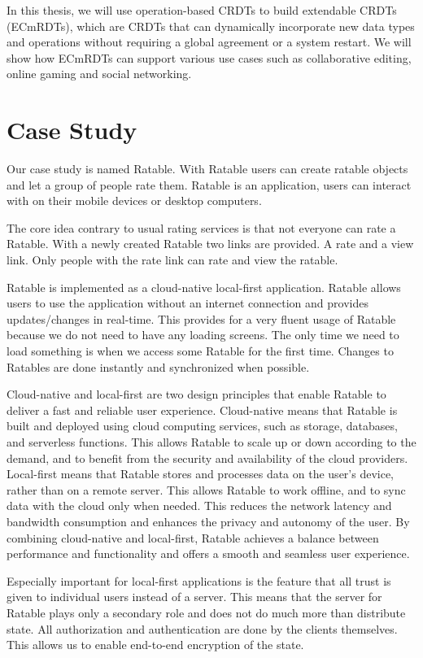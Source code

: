 \documentclass[
	ngerman,
	ruledheaders=section,   %
	class=report,		    %
	thesis={type=bachelor}, %
	accentcolor=9c,			%
	custommargins=true,    %
	marginpar=false,        %
	parskip=half-,          %
	fontsize=11pt,          %
]{tudapub}
\begin{document}
In this thesis, we will use operation-based CRDTs to build extendable CRDTs (ECmRDTs), which are CRDTs that can dynamically incorporate new data types and operations without requiring a global agreement or a system restart. We will show how ECmRDTs can support various use cases such as collaborative editing, online gaming and social networking.

\section{Case Study}
Our case study is named Ratable. With Ratable users can create ratable objects and let a group of people rate them. Ratable is an application, users can interact with on their mobile devices or desktop computers. 

The core idea contrary to usual rating services is that not everyone can rate a Ratable. With a newly created Ratable two links are provided. A rate and a view link. Only people with the rate link can rate and view the ratable.

Ratable is implemented as a cloud-native local-first application. Ratable allows users to use the application without an internet connection and provides updates/changes in real-time. This provides for a very fluent usage of Ratable because we do not need to have any loading screens. The only time we need to load something is when we access some Ratable for the first time. Changes to Ratables are done instantly and synchronized when possible.

Cloud-native and local-first are two design principles that enable Ratable to deliver a fast and reliable user experience. Cloud-native means that Ratable is built and deployed using cloud computing services, such as storage, databases, and serverless functions. This allows Ratable to scale up or down according to the demand, and to benefit from the security and availability of the cloud providers. Local-first means that Ratable stores and processes data on the user’s device, rather than on a remote server. This allows Ratable to work offline, and to sync data with the cloud only when needed. This reduces the network latency and bandwidth consumption and enhances the privacy and autonomy of the user. By combining cloud-native and local-first, Ratable achieves a balance between performance and functionality and offers a smooth and seamless user experience.

Especially important for local-first applications is the feature that all trust is given to individual users instead of a server. This means that the server for Ratable plays only a secondary role and does not do much more than distribute state. All authorization and authentication are done by the clients themselves. This allows us to enable end-to-end encryption of the state.
\end{document}
